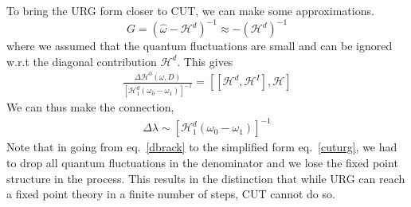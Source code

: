 \documentclass[twoside,11pt]{report}
\numberwithin{equation}{section}
\begin{document}
\\\\To bring the URG form closer to CUT, we can make some approximations. 
\begin{equation}
G = \left(\hat \omega - \mathcal{H}^d\right)^{-1} \approx -\left(\mathcal{H}^d\right)^{-1}
\end{equation}
where we assumed that the quantum fluctuations are small and can be ignored w.r.t the diagonal contribution \(\mathcal{H}^d\). This gives
\begin{equation}\begin{aligned}
	\label{cuturg}
	\frac{\Delta \mathcal{H}^0(\omega,D)}{\left[\mathcal{H}^d_1\left(\omega_0 - \omega_1\right)\right]^{-1}} =  \left[\left[\mathcal{H}^d,\mathcal{H}^I\right],\mathcal{H}\right]
\end{aligned}\end{equation}
We can thus make the connection,
\begin{equation}\begin{aligned}
\Delta \lambda \sim \left[\mathcal{H}^d_1\left(\omega_0 - \omega_1\right)\right]^{-1}
\end{aligned}\end{equation}
Note that in going from eq.~\ref{dbrack} to the simplified form eq.~\ref{cuturg}, we had to drop all quantum fluctuations in the denominator and we lose the fixed point structure in the process. This results in the distinction that while URG can reach a fixed point theory in a finite number of steps, CUT cannot do so.
\end{document}

